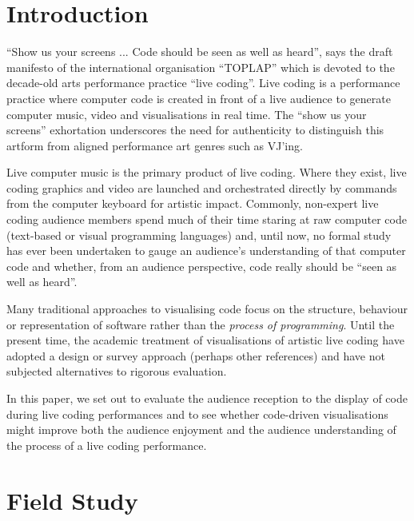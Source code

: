 \documentclass{sig-alternate}
\begin{document}



\section{Introduction}

``Show us your screens ... Code should be seen as well as heard'', says the draft manifesto of the international organisation ``TOPLAP'' \cite{Toplap} which is devoted to the decade-old arts performance practice ``live coding''. Live coding is a performance practice where computer code is created in front of a live audience to generate computer music, video and visualisations in real time. The ``show us your screens'' exhortation underscores the need for authenticity to distinguish this artform from aligned performance art genres such as VJ'ing. 

Live computer music is the primary product of live coding. Where they exist, live coding graphics and video are launched and orchestrated directly by commands from the computer keyboard for artistic impact. Commonly, non-expert live coding audience members spend much of their time staring at raw computer code (text-based or visual programming languages) and, until now, no formal study has ever been undertaken to gauge an audience's understanding of that computer code and whether, from an audience perspective, code really should be ``seen as well as heard''. 

Many traditional approaches to visualising code focus on the structure, behaviour or representation of software rather than the {\it process of programming}. Until the present time, the academic treatment of visualisations of artistic live coding have adopted a design or survey approach \cite{McLean2010b}(perhaps other references) and have not subjected alternatives to rigorous evaluation.

In this paper, we set out to evaluate the audience reception to the display of code during live coding performances and to see whether code-driven visualisations might improve both the audience enjoyment and the audience understanding of the process of a live coding performance.

\section{Field Study}
\end{document}
